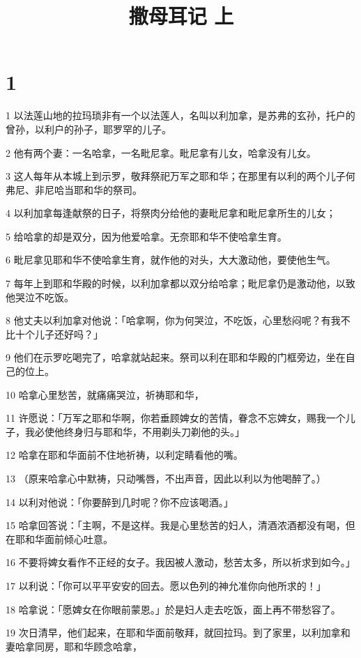 

\title{撒母耳记 上}


\chapter{1}

\par 1 以法莲山地的拉玛琐非有一个以法莲人，名叫以利加拿，是苏弗的玄孙，托户的曾孙，以利户的孙子，耶罗罕的儿子。
\par 2 他有两个妻：一名哈拿，一名毗尼拿。毗尼拿有儿女，哈拿没有儿女。
\par 3 这人每年从本城上到示罗，敬拜祭祀万军之耶和华；在那里有以利的两个儿子何弗尼、非尼哈当耶和华的祭司。
\par 4 以利加拿每逢献祭的日子，将祭肉分给他的妻毗尼拿和毗尼拿所生的儿女；
\par 5 给哈拿的却是双分，因为他爱哈拿。无奈耶和华不使哈拿生育。
\par 6 毗尼拿见耶和华不使哈拿生育，就作他的对头，大大激动他，要使他生气。
\par 7 每年上到耶和华殿的时候，以利加拿都以双分给哈拿；毗尼拿仍是激动他，以致他哭泣不吃饭。
\par 8 他丈夫以利加拿对他说：「哈拿啊，你为何哭泣，不吃饭，心里愁闷呢？有我不比十个儿子还好吗？」
\par 9 他们在示罗吃喝完了，哈拿就站起来。祭司以利在耶和华殿的门框旁边，坐在自己的位上。
\par 10 哈拿心里愁苦，就痛痛哭泣，祈祷耶和华，
\par 11 许愿说：「万军之耶和华啊，你若垂顾婢女的苦情，眷念不忘婢女，赐我一个儿子，我必使他终身归与耶和华，不用剃头刀剃他的头。」
\par 12 哈拿在耶和华面前不住地祈祷，以利定睛看他的嘴。
\par 13 （原来哈拿心中默祷，只动嘴唇，不出声音，因此以利以为他喝醉了。）
\par 14 以利对他说：「你要醉到几时呢？你不应该喝酒。」
\par 15 哈拿回答说：「主啊，不是这样。我是心里愁苦的妇人，清酒浓酒都没有喝，但在耶和华面前倾心吐意。
\par 16 不要将婢女看作不正经的女子。我因被人激动，愁苦太多，所以祈求到如今。」
\par 17 以利说：「你可以平平安安的回去。愿以色列的神允准你向他所求的！」
\par 18 哈拿说：「愿婢女在你眼前蒙恩。」於是妇人走去吃饭，面上再不带愁容了。
\par 19 次日清早，他们起来，在耶和华面前敬拜，就回拉玛。到了家里，以利加拿和妻哈拿同房，耶和华顾念哈拿，
